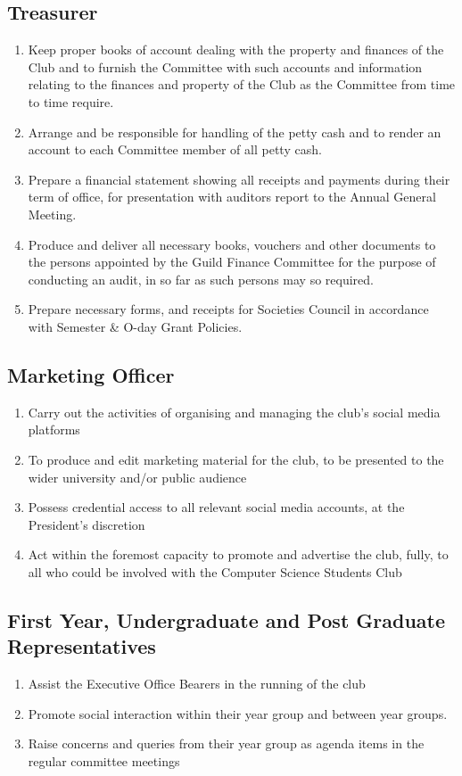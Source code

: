 \documentclass[10pt,a4paper]{report}
\begin{document}
		\subsection{Treasurer}
			\begin{enumerate}[label=\alph*]
				\item Keep proper books of account dealing with the property and finances of the Club and to furnish the Committee with such accounts and information relating to the finances and property of the Club as the Committee from time to time require.
				\item Arrange and be responsible for handling of the petty cash and to render an account to each Committee member of all petty cash.
				\item Prepare a financial statement showing all receipts and payments during their term of office, for presentation with auditors report to the Annual General Meeting.
				\item Produce and deliver all necessary books, vouchers and other documents to the persons appointed by the Guild Finance Committee for the purpose of conducting an audit, in so far as such persons may so required.
				\item Prepare necessary forms, and receipts for Societies Council in accordance with Semester \& O-day Grant Policies.
			\end{enumerate}
		\subsection{Marketing Officer}
            \begin{enumerate}[label=\alph*]
                \item Carry out the activities of organising and managing the club's social media platforms
                \item To produce and edit marketing material for the club, to be presented to the wider university and/or public audience
                \item Possess credential access to all relevant social media accounts, at the President's discretion
                \item Act within the foremost capacity to promote and advertise the club, fully, to all who could be involved with the Computer Science Students Club
            \end{enumerate}
		\subsection{First Year, Undergraduate and Post Graduate Representatives}
			\begin{enumerate}[label=\alph*]
				\item Assist the Executive Office Bearers in the running of the club
				\item Promote social interaction within their year group and between year groups.
				\item Raise concerns and queries from their year group as agenda items in the regular committee meetings
			\end{enumerate}
\end{document}
